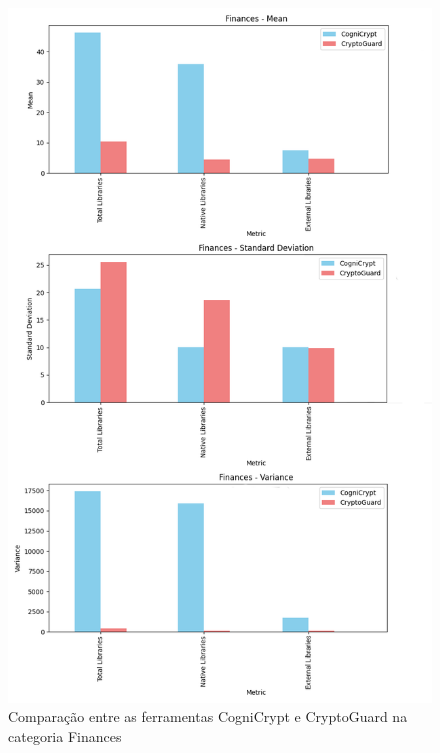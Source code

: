 \begin{figure}[!ht]
    \centering
    \includegraphics[scale=0.6]{img/plot_cc_x_cg_finances.png}
    \caption{Comparação entre as ferramentas CogniCrypt e CryptoGuard na categoria Finances}
    \label{img: CCvsCG_Finances}
\end{figure}

\FloatBarrier

